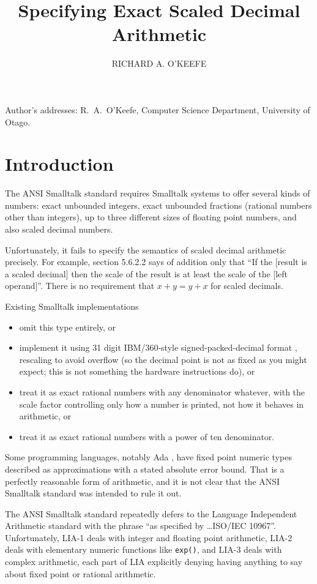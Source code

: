 \documentclass[prodmode,acmtoplas]{acmsmall}
\title{Specifying Exact Scaled Decimal Arithmetic}
\author{RICHARD A. O'KEEFE \affil{University of Otago}}
\begin{document}
\begin{bottomstuff}
Author's addresses: R.~A.~O'Keefe, Computer Science Department,
University of Otago.
\end{bottomstuff}
\def\hask#1{\textsf{#1}}

\maketitle

\section{Introduction}

The ANSI Smalltalk standard \cite{ANST} requires Smalltalk
systems to offer several kinds of numbers:  exact unbounded integers,
exact unbounded fractions (rational numbers other than integers),
up to three different sizes of floating point numbers, and also
scaled decimal numbers.

Unfortunately, it fails to specify the semantics of scaled decimal
arithmetic precisely.  For example, section 5.6.2.2
says of addition only that ``If the [result is a scaled decimal]
then the scale of the result is at least the scale of the [left
operand]''.  There is no requirement that $x+y=y+x$ for scaled decimals.

Existing Smalltalk implementations
\begin{itemize}
\item omit this type entirely, or
\item implement it using 31 digit IBM/360-style
signed-packed-decimal format \cite[page 8-1]{Z360},
rescaling to avoid overflow (so the decimal point is not as
fixed as you might expect; this is not something the hardware
instructions do), or
\item treat it as exact rational numbers with any denominator
whatever, with the scale factor controlling only how a number
is printed, not how it behaves in arithmetic, or
\item treat it as exact rational numbers with a power of ten
denominator.
\end{itemize}

Some programming languages, notably Ada \cite{ADA2,ADAW}, have fixed point
numeric types described as approximations with a stated absolute error
bound.
That is a perfectly reasonable form of arithmetic, and it is not clear
that the ANSI Smalltalk standard was intended to rule it out.

The ANSI Smalltalk standard repeatedly defers to the Language
Independent Arithmetic \cite{LIA1} standard with the phrase ``as
specified by \dots ISO/IEC 10967''.
Unfortunately, LIA-1 \cite{LIA1} deals with integer and floating point
arithmetic, LIA-2 \cite{LIA2} deals with elementary numeric functions
like \verb|exp()|, and LIA-3 \cite{LIA3} deals with complex arithmetic,
each part of LIA explicitly denying having anything to say about fixed
point or rational arithmetic.
\end{document}
